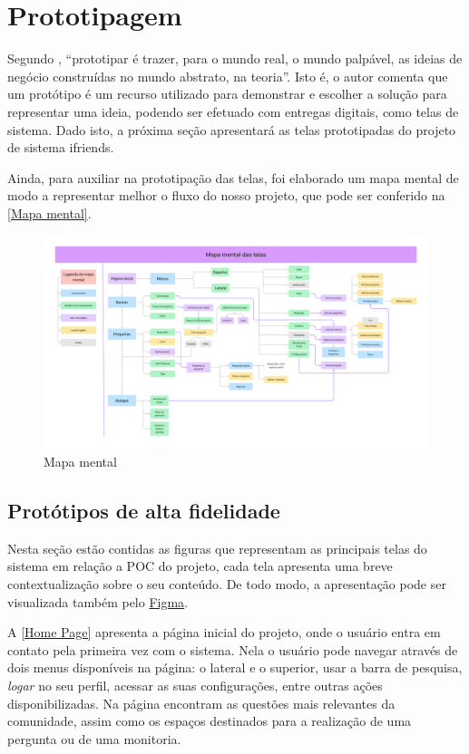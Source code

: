 \section{Prototipagem}
Segundo , ``prototipar é trazer, para o mundo real, o mundo palpável, as ideias de negócio construídas no mundo abstrato, na teoria''. Isto é, o autor comenta que um protótipo é um recurso utilizado para demonstrar e escolher a solução para representar uma ideia, podendo ser efetuado com entregas digitais, como telas de sistema. Dado isto, a próxima seção apresentará as telas prototipadas do projeto de sistema \gls{ifriends}.

Ainda, para auxiliar na prototipação das telas, foi elaborado um mapa mental de modo a representar melhor o fluxo do nosso projeto, que pode ser conferido na \autoref{Mapa mental}.

\begin{figure}[htb]
\centering
\caption{\label{Mapa mental} Mapa mental}
\includegraphics[width=1\textwidth]{anexos/Imagens_Prototipo/Mapa_Mental.png}
\end{figure}
\FloatBarrier

\subsection{Protótipos de alta fidelidade}
Nesta seção estão contidas as figuras que representam as principais telas do sistema em relação a \gls{POC} do projeto, cada tela apresenta uma breve contextualização sobre o seu conteúdo. De todo modo, a apresentação pode ser visualizada também pelo \href{https://www.figma.com/proto/GhIlybDubGmr3NkRU0a9GP/Protótipo---IFriends?node-id=73\%3A321}{Figma}.

A \autoref{Home Page} apresenta a página inicial do projeto, onde o usuário entra em contato pela primeira vez com o sistema. Nela o usuário pode navegar através de dois menus disponíveis na página: o lateral e o superior, usar a barra de pesquisa, \textit{logar} no seu perfil, acessar as suas configurações, entre outras ações disponibilizadas. Na página encontram as questões mais relevantes da comunidade, assim como os espaços destinados para a realização de uma pergunta ou de uma monitoria.

